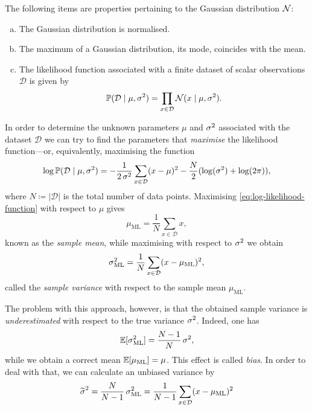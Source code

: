 \begin{proposition}
\label{prop:gaussian-distribution-basic-properties}
The following items are properties pertaining to the Gaussian distribution
\(\operatorname{\mathcal{N}}\):
\begin{enumerate}[(a)]\setlength\itemsep{0em}
\item The Gaussian distribution is normalised.

\item The maximum of a Gaussian distribution, its mode, coincides with the mean.

\item The likelihood function associated with a finite dataset of scalar
  observations \(\mathcal{D}\) is given by
  \[
  \operatorname{\mathbb{P}}(\mathcal{D} \mid \mu, \operatorname{\sigma}^2)
  = \prod_{x \in \mathcal{D}} \operatorname{\mathcal{N}}(x \mid \mu, \operatorname{\sigma}^2).
  \]
\end{enumerate}
\end{proposition}

\begin{remark}
\label{rem:find-mean-and-variance-with-maximum-likelihood}
In order to determine the unknown parameters \(\mu\) and \(\operatorname{\sigma}^2\) associated
with the dataset \(\mathcal{D}\) we can try to find the parameters that
\emph{maximise} the likelihood function---or, equivalently, maximising the
function
\begin{equation}\label{eq:log-likelihood-function}
\log \operatorname{\mathbb{P}}(\mathcal{D} \mid \mu, \operatorname{\sigma}^2)
= - \frac{1}{2 \operatorname{\sigma}^{2}}
\sum_{x \in \mathcal{D}} (x - \mu)^2 - \frac{N}{2}(\log(\operatorname{\sigma}^2) + \log(2 \pi)),
\end{equation}
where \(N \coloneq |\mathcal{D}|\) is the total number of data points.
Maximising \cref{eq:log-likelihood-function} with respect to \(\mu\) gives
\[
\mu_{\text{ML}} = \frac{1}{N} \sum_{x \in \mathcal{D}} x,
\]
known as the \emph{sample mean}, while maximising with respect to \(\operatorname{\sigma}^2\)
we obtain
\[
\operatorname{\sigma}^2_{\text{ML}} = \frac{1}{N} \sum_{x \in \mathcal{D}} (x - \mu_{\text{ML}})^2,
\]
called the \emph{sample variance} with respect to the sample mean
\(\mu_{\text{ML}}\).

The problem with this approach, however, is that the obtained sample variance is
\emph{underestimated} with respect to the true variance \(\operatorname{\sigma}^2\). Indeed,
one has
\[
\operatorname{\mathbb{E}}[\operatorname{\sigma}^2_{\text{ML}}] = \frac{N-1}{N} \operatorname{\sigma}^2,
\]
while we obtain a correct mean \(\operatorname{\mathbb{E}}[\mu_{\text{ML}}] = \mu\). This effect
is called \emph{bias}. In order to deal with that, we can calculate an unbiased
variance by
\[
\widetilde{\operatorname{\sigma}}^2 = \frac{N}{N-1} \operatorname{\sigma}^2_{\text{ML}}
= \frac{1}{N-1} \sum_{x \in \mathcal{D}} (x - \mu_{\text{ML}})^2
\]
\end{remark}

